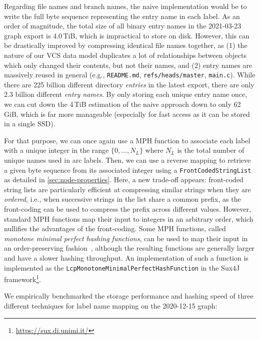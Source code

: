Regarding file names and branch names, the naive implementation would be to
write the full byte sequence representing the entry name in each label. As an
order of magnitude, the total size of all binary entry names in the
2021-03-23 graph export is 4.0\,TiB, which is impractical to store on disk.
However, this can be drastically improved by compressing identical file names
together, as (1) the nature of our \gls{VCS} data model duplicates a lot of
relationships between objects which only changed their contents, but not their
names, and (2) entry names are massively reused in general (e.g.,
\texttt{README.md}, \texttt{refs/heads/master}, \texttt{main.c}).
While there are 225 billion different directory \emph{entries} in the
latest export, there are only 2.3 billion different \emph{entry names}.
By only storing each unique entry name once, we can cut down the 4\,TiB
estimation of the naive approach down to only 62\,GiB, which is far more
manageable (especially for fast access as it can be stored in a single SSD).

For that purpose, we can once again use a \gls{MPH} function to associate each
label with a unique integer in the range $\{0, \ldots, N_L\}$ where $N_L$ is
the total number of unique names used in arc labels. Then, we can use a reverse
mapping to retrieve a given byte sequence from its associated integer using a
\texttt{FrontCodedStringList} as detailed in \cref{sec:node-properties}.  Here,
a new trade-off appears: front-coded string lists are particularly efficient at
compressing similar strings when they are \emph{ordered}, i.e., when successive
strings in the list share a common prefix, as the front-coding can be used to
compress the prefix across different values. However, standard \gls{MPH}
functions map their input to integers in an arbitrary order, which nullifies
the advantages of the front-coding. Some \gls{MPH} functions, called
\emph{monotone minimal perfect hashing functions}, can be used to map their
input in an order-preserving fashion~\cite{belazzougui2008theory}, although the
resulting functions are generally larger and have a slower hashing throughput.
An implementation of such a function is implemented as the
\texttt{LcpMonotoneMinimalPerfectHashFunction} in the Sux4J
framework\footnote{\url{https://sux.di.unimi.it/}}.

We empirically benchmarked the storage performance and hashing speed of three
different techniques for label name mapping on the 2020-12-15 graph:

